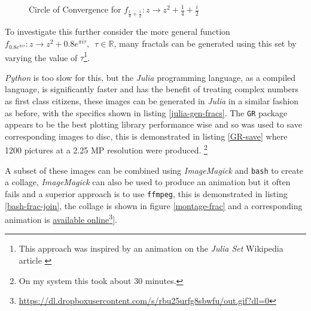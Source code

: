 \documentclass[11pt]{article}
\begin{document}
\begin{figure}[htbp]
\centering

\caption{\label{py-jl-rab-plot}Circle of Convergence for \(f_{\frac{1}{4} + \frac{i}{2}}: z \rightarrow z^{2} + \frac{1}{4} + \frac{i}{2}\)}
\end{figure}

To investigate this further consider the
more general function \(f_{0.8 e^{\pi i \tau}}: z \rightarrow z^{2} + 0.8 e^{\pi
i \tau}, \enspace \tau \in \mathbb{R}\), many fractals can be generated using
this set by varying the value of \(\tau\)\footnote{This approach was inspired by an animation on the \emph{Julia Set} Wikipedia article \cite{JuliaSet2020}}.

\emph{Python} is too slow for this, but the \emph{Julia} programming language, as a
compiled language, is significantly faster and has the benefit of treating
complex numbers as first class citizens, these images can be generated in
\emph{Julia} in a similar fashion as before, with the specifics shown in listing
\ref{julia-gen-fracs}. The \texttt{GR} package appears to be the best plotting library
performance wise and so was used to save corresponding images to disc, this is
demonstrated in listing \ref{GR-save} where 1200 pictures at a 2.25 MP resolution were produced. \footnote{On my system this took about 30 minutes.}

A subset of these images can be combined using \emph{ImageMagick} and \texttt{bash} to
create a collage, \emph{ImageMagick} can also be used to produce an animation but it often
fails and a superior approach is to use \texttt{ffmpeg}, this is demonstrated in
listing \ref{bash-frac-join}, the collage is shown in figure \ref{montage-frac} and a corresponding
animation is \href{https://dl.dropboxusercontent.com/s/rbu25urfg8sbwfu/out.gif?dl=0}{available online}\footnote{\href{https://dl.dropboxusercontent.com/s/rbu25urfg8sbwfu/out.gif?dl=0}{https://dl.dropboxusercontent.com/s/rbu25urfg8sbwfu/out.gif?dl=0}}].
\end{document}
